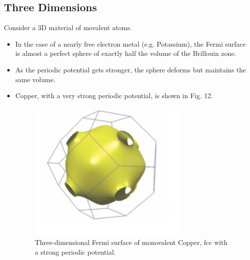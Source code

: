 \documentclass[10pt]{article}
\begin{document}
\subsection{Three Dimensions}
Consider a 3D material of movalent atoms.
\begin{itemize}
  \item In the case of a nearly free electron metal (e.g. Potassium), the Fermi surface is almost a perfect sphere of exactly
  half the volume of the Brillouin zone.
  \item As the periodic potential gets stronger, the sphere deforms but maintains the same volume.
  \item Copper, with a very strong periodic potential, is shown in Fig. 12.


  \begin{figure}
    \centering
      \includegraphics[width=\textwidth]{tb14}
      \caption{Three-dimensional Fermi surface of monovalent Copper, fcc with a strong periodic potential.}
  \end{figure}
\end{itemize}
\end{document}

